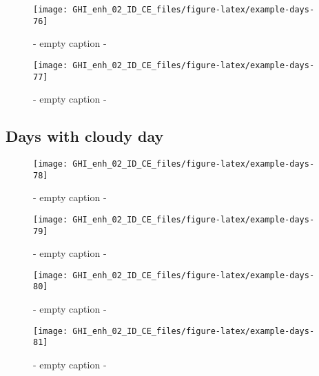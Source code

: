 \documentclass[
  10pt,
  a4paper,oneside]{article}
\begin{document}
\begin{figure}[H]

{\centering \texttt{[image: GHI\_enh\_02\_ID\_CE\_files/figure-latex/example-days-76]} 

}

\caption{ - empty caption - }\label{fig:example-days-76}
\end{figure}

\begin{figure}[H]

{\centering \texttt{[image: GHI\_enh\_02\_ID\_CE\_files/figure-latex/example-days-77]} 

}

\caption{ - empty caption - }\label{fig:example-days-77}
\end{figure}

\FloatBarrier

\hypertarget{days-with-cloudy-day}{%
\subsection{Days with cloudy day}\label{days-with-cloudy-day}}

\begin{figure}[H]

{\centering \texttt{[image: GHI\_enh\_02\_ID\_CE\_files/figure-latex/example-days-78]} 

}

\caption{ - empty caption - }\label{fig:example-days-78}
\end{figure}

\begin{figure}[H]

{\centering \texttt{[image: GHI\_enh\_02\_ID\_CE\_files/figure-latex/example-days-79]} 

}

\caption{ - empty caption - }\label{fig:example-days-79}
\end{figure}

\begin{figure}[H]

{\centering \texttt{[image: GHI\_enh\_02\_ID\_CE\_files/figure-latex/example-days-80]} 

}

\caption{ - empty caption - }\label{fig:example-days-80}
\end{figure}

\begin{figure}[H]

{\centering \texttt{[image: GHI\_enh\_02\_ID\_CE\_files/figure-latex/example-days-81]} 

}

\caption{ - empty caption - }\label{fig:example-days-81}
\end{figure}
\end{document}
